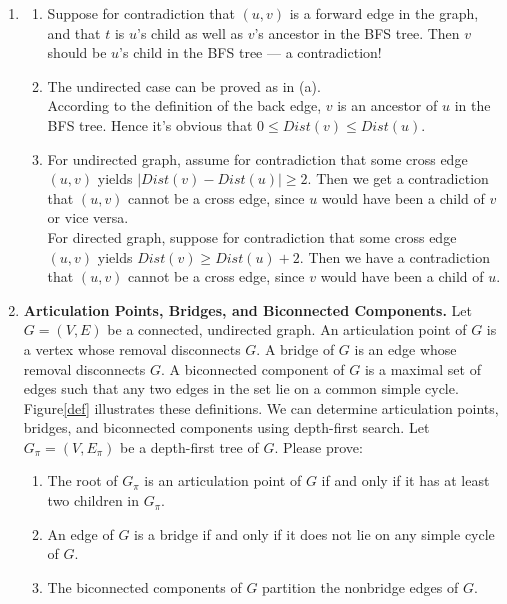 \documentclass[12pt,a4paper]{article}
\makeatletter
\newtheorem*{solution}{Solution}
\theoremstyle{definition}
\renewenvironment{solution}[1][Solution] {\par\pushQED{\qed}\normalfont\topsep6\p@\@plus6\p@\relax\trivlist\item[\hskip\labelsep\bfseries#1\@addpunct{.}]\ignorespaces}{\popQED\endtrivlist\@endpefalse} \makeatother
\makeatother
\begin{document}
\begin{enumerate}
	\begin{solution}
		\hfill
		\begin{enumerate}
			\item 
			Suppose for contradiction that $(u, v)$ is a forward edge in the graph, and that $t$ is $u$'s child as well as $v$'s ancestor in the BFS tree. Then $v$ should be $u$'s child in the BFS tree --- a contradiction! 
			\item
			The undirected case can be proved as in (a). \\
			According to the definition of the back edge, $v$ is an ancestor of $u$ in the BFS tree. Hence it's obvious that $0\leq Dist(v)\leq Dist(u)$.
			\item
			For undirected graph, assume for contradiction that some cross edge $(u, v)$ yields $|Dist(v)-Dist(u)|\geq 2$. Then we get a contradiction that $(u, v)$ cannot be a cross edge, since $u$ would have been a child of $v$ or vice versa. \\
			For directed graph, suppose for contradiction that some cross edge $(u, v)$ yields $Dist(v)\geq Dist(u)+2$. Then we have a contradiction that $(u, v)$ cannot be a cross edge, since $v$ would have been a child of $u$.
		\end{enumerate}
	\end{solution}

    \item 
    \textbf{Articulation Points, Bridges, and Biconnected Components.} Let $G=(V, E)$ be a connected, undirected graph. An articulation point of $G$ is a vertex whose removal disconnects $G$. A bridge of $G$ is an edge whose removal disconnects $G .$ A biconnected component of $G$ is a maximal set of edges such that any two edges in the set lie on a common simple cycle. Figure\ref{def} illustrates these definitions. We can determine articulation points, bridges, and biconnected components using depth-first search. Let $G_{\pi}=\left(V, E_{\pi}\right)$ be a depth-first tree of $G$. Please prove:
    
    \begin{enumerate}
    	\item The root of $G_{\pi}$ is an articulation point of $G$ if and only if it has at least two children in $G_{\pi}$.
    	\item An edge of $G$ is a bridge if and only if it does not lie on any simple cycle of $G$.
    	\item The biconnected components of $G$ partition the nonbridge edges of $G$.
    \end{enumerate}


\end{enumerate}
\end{document}
